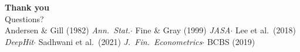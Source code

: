 \documentclass[10pt,aspectratio=169]{beamer}
\begin{document}
\begin{frame}[plain]
    \vspace*{2em}
    \begin{center}
        {\Huge \textbf{Thank you}}\\[1.5em]
        {\Large Questions?}\\[2.5em]
        \small
        Andersen \& Gill (1982) \textit{Ann.\ Stat.}\enspace$\cdot$\enspace
        Fine \& Gray (1999) \textit{JASA}\enspace$\cdot$\enspace
        Lee et al.\ (2018) \textit{DeepHit}\enspace$\cdot$\enspace
        Sadhwani et al.\ (2021) \textit{J.\ Fin.\ Econometrics}\enspace$\cdot$\enspace
        BCBS (2019)
    \end{center}
\end{frame}
\end{document}
